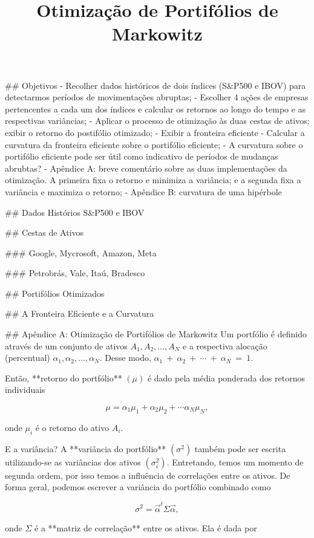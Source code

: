 \documentclass{article}
\title{Otimização de Portifólios de Markowitz}
\begin{document}
\maketitle    

## Objetivos
- Recolher dados históricos de dois índices (S&P500 e IBOV) para detectarmos períodos de movimentações abruptas;
- Escolher 4 ações de empresas pertencentes a cada um dos índices e calcular os retornos ao longo do tempo e as respectivas variâncias;
- Aplicar o processo de otimização às duas cestas de ativos; exibir o retorno do postifólio otimizado;
- Exibir a fronteira eficiente
- Calcular a curvatura da fronteira eficiente sobre o portifólio eficiente;
- A curvatura sobre o portifólio eficiente pode ser útil como indicativo de períodos de mudanças abrubtas?
- Apêndice A: breve comentário sobre as duas implementações da otimização. A primeira fixa o retorno e minimiza a variância; e a segunda fixa a variância e maximiza o retorno;
- Apêndice B: curvatura de uma hipérbole

## Dados Histórios S&P500 e IBOV

## Cestas de Ativos

### Google, Mycrosoft, Amazon, Meta

### Petrobrás, Vale, Itaú, Bradesco

## Portifólios Otimizados

## A Fronteira Eficiente e a Curvatura

## Apêndice A: Otimização de Portifólios de Markowitz
Um portfólio é definido através de um conjunto de ativos $A_1, A_2, ... , A_N$ e a respectiva alocação (percentual) $\alpha_1, \alpha_2, ... , \alpha_N$. Desse modo, $\alpha_1~+~\alpha_2~+~\cdots~+~\alpha_N~=~1$.

Então, **retorno do portfólio** $(\mu)$ é dado pela média ponderada dos retornos individuais

$$\mu = \alpha_1\mu_1 + \alpha_2\mu_2 + \cdots \alpha_N\mu_N,$$

onde $\mu_i$ é o retorno do ativo $A_i$. 

E a variância? A **variância do portfólio** $(\sigma^2)$ também pode ser escrita utilizando-se as variâncias dos ativos $(\sigma_i^2)$. Entretando, temos um momento de segunda ordem, por isso temos a influência de correlações entre os ativos. De forma geral, podemos escrever a variância do portfólio combinado como 

$$ \sigma^2 = \vec{\alpha}^t \Sigma \vec{\alpha},$$

onde $\Sigma$ é a **matriz de correlação** entre os ativos. Ela é dada por
\end{document}
